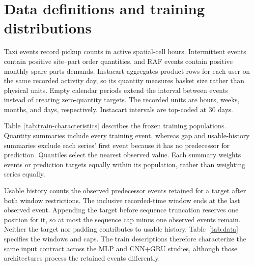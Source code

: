 \section{Data definitions and training distributions}
\label{app:data-characteristics}
Taxi events record pickup counts in active spatial-cell hours. Intermittent
events contain positive site--part order quantities, and RAF events contain
positive monthly spare-parts demands. Instacart aggregates product rows for
each user on the same recorded activity day, so its quantity measures basket
size rather than physical units. Empty calendar periods extend the interval
between events instead of creating zero-quantity targets. The recorded units
are hours, weeks, months, and days, respectively. Instacart intervals are
top-coded at 30 days.

Table~\ref{tab:train-characteristics} describes the frozen training
populations. Quantity summaries include every training event, whereas gap
and usable-history summaries exclude each series' first event because it
has no predecessor for prediction. Quantiles select the nearest observed
value. Each summary weights events or prediction targets equally within
its population, rather than weighting series equally.

Usable history counts the observed predecessor events retained for a target
after both window restrictions. The inclusive recorded-time window ends at
the last observed event. Appending the target before sequence truncation
reserves one position for it, so at most the sequence cap minus one observed
events remain. Neither the target nor padding contributes to usable history.
Table~\ref{tab:data} specifies the windows and caps. The train descriptions
therefore characterize the same input contract across the MLP and CNN+GRU
studies, although those architectures process the retained events differently.

